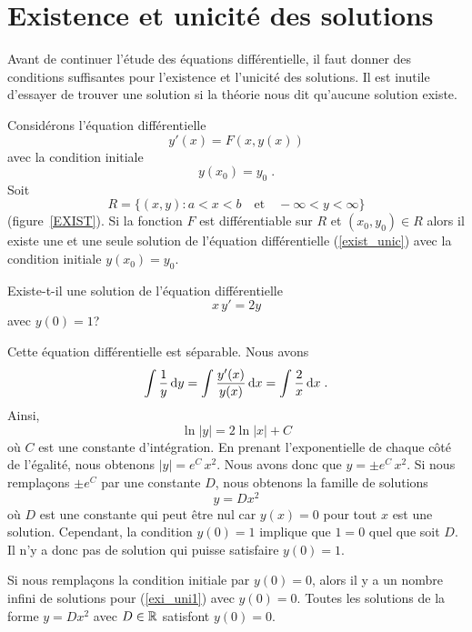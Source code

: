 {\section{Existence et unicité des solutions  \theory}\label{ODEexistsol}

Avant de continuer l'étude des équations différentielle, il faut
donner des conditions suffisantes pour l'existence et l'unicité des
solutions.  Il est inutile d'essayer de trouver une solution si la
théorie nous dit qu'aucune solution existe.

\begin{theorem}
Considérons l'équation différentielle
\begin{equation}\label{exist_unic}
y'(x) = F(x,y(x))
\end{equation}
avec la condition initiale
\[
y(x_0) = y_0 \; .
\]
Soit
\[
R = \{ (x,y) : a < x < b \quad \text{et}\quad -\infty < y < \infty \}
\]
(figure~\ref{EXIST}).  Si la fonction
$F$ est différentiable sur $R$ et $(x_0,y_0) \in R$ alors il existe
une et une seule solution de l'équation différentielle
(\ref{exist_unic}) avec la condition initiale $y(x_0)=y_0$.
\end{theorem}


\begin{egg}
Existe-t-il une solution de l'équation différentielle
\begin{equation}\label{exi_uni1}
x\, y'= 2 y
\end{equation}
avec $y(0)=1$?

Cette équation différentielle est séparable.  Nous avons
\[
\int \frac{1}{y} \,\mathrm{d}y = \int \frac{y'(x)}{y(x)} \,\mathrm{d}x
= \int \frac{2}{x} \,\mathrm{d}x \; .
\]
Ainsi,
\[
\ln|y| = 2\ln|x| + C
\]
où $C$ est une constante d'intégration.  En prenant l'exponentielle de
chaque côté de l'égalité, nous obtenons $|y| = e^C \,x^2$.  Nous avons donc que
$y = \pm e^C \, x^2$.  Si nous remplaçons $\pm e^C$ par une constante
$D$, nous obtenons la famille de solutions  
\[
y = Dx^2
\]
où $D$ est une constante qui peut être nul car $y(x)=0$ pour tout $x$
est une solution.  Cependant, la condition $y(0)=1$ implique
que $1 = 0$ quel que soit $D$.  Il n'y a donc pas de solution qui
puisse satisfaire $y(0)=1$.

Si nous remplaçons la condition initiale par $y(0)=0$, alors il y a
un nombre infini de solutions pour (\ref{exi_uni1}) avec $y(0)=0$.  Toutes les
solutions de la forme $y=Dx^2$ avec $D\in \mathbb{R}$ satisfont $y(0)=0$.


\end{egg}}
